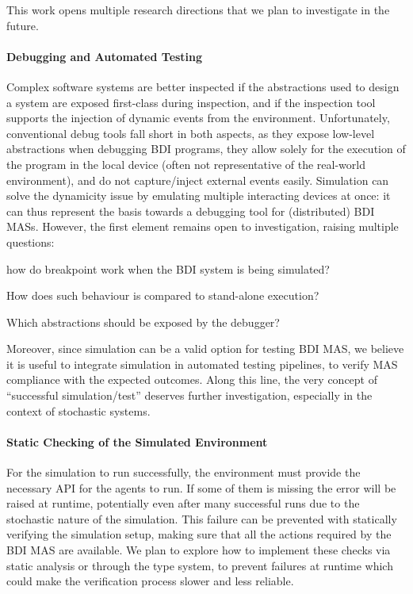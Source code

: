 This work opens multiple research directions that we plan to investigate in the future.

\paragraph{Debugging and Automated Testing}
Complex software systems are better inspected if the abstractions
used to design a system are exposed first-class during inspection,
and if the inspection tool supports the injection of dynamic events from the environment.
%
Unfortunately,
conventional debug tools fall short in both aspects,
as they expose low-level abstractions when debugging \ac{BDI} programs,
they allow solely for the execution of the program in the local device
(often not representative of the real-world environment),
and do not capture/inject external events easily.
%
Simulation can solve the dynamicity issue by
emulating multiple interacting devices at once:
it can thus represent the basis towards a debugging tool for (distributed) BDI MASs.
%
However, the first element remains open to investigation, raising multiple questions:
\begin{inlinelist}
    \item how do breakpoint work when the \ac{BDI} system is being simulated?
    \item How does such behaviour is compared to stand-alone execution?
    \item Which abstractions should be exposed by the debugger?
\end{inlinelist}
%
Moreover,
since simulation can be a valid option for testing \ac{BDI} \ac{MAS},
we believe it is useful to integrate simulation in automated testing pipelines,
to verify \ac{MAS} compliance with the expected outcomes.
%
Along this line,
the very concept of ``successful simulation/test''
deserves further investigation, especially in the context of stochastic systems.

\paragraph{Static Checking of the Simulated Environment}
For the simulation to run successfully,
the environment must provide the necessary \ac{API} for the agents to run.
%
If some of them is missing the error will be raised at runtime,
potentially even after many successful runs due to the stochastic nature of the simulation.
%
This failure can be prevented with statically verifying the simulation setup,
making sure that all the actions required by the \ac{BDI} \ac{MAS} are available.
%
We plan to explore how to implement these checks
via static analysis or through the type system,
to prevent failures at runtime which could make the verification process slower and less reliable.

